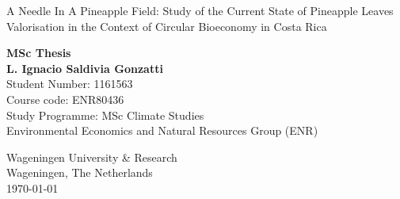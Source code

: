 \begin{titlepage}

\vspace*{2cm}
\centering
\begin{Large}\bfseries

A Needle In A Pineapple Field: Study of the Current State of Pineapple Leaves Valorisation in the Context of Circular Bioeconomy in Costa Rica

\end{Large}

\vspace{2cm}

\begin{center}%

\textbf{MSc Thesis} \\ \vspace{2cm}
\textbf{L. Ignacio Saldivia Gonzatti} \\ \vspace{0.25cm}
 Student Number: 1161563 \\ \vspace{0.25cm}
Course code: ENR80436\\  \vspace{0.25cm}
Study Programme: MSc Climate Studies \\ \vspace{0.25cm}
Environmental Economics and Natural Resources Group (ENR)  \vspace{0.25cm}


       \vfill
            
            
        Wageningen University \& Research\\
        Wageningen, The Netherlands\\
       \today

\end{center}
\end{titlepage}

